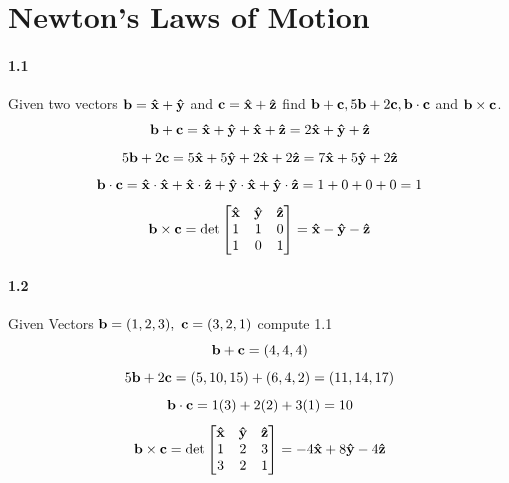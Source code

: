 \documentclass[../problems.tex]{subfiles}
\begin{document}
\section{Newton's Laws of Motion}
\barh

\paragraph{1.1}
Given two vectors $\mathbf{b} = \mathbf{\hat x} + \mathbf{\hat y} $ and $\mathbf{c} = \mathbf{\hat x} + 
\mathbf{\hat z}$ find $\mathbf{b} + \mathbf{c}, 5 \mathbf{b} + 2 \mathbf{c}, \mathbf{b}\cdot \mathbf{c}$ and $\mathbf{b}\times \mathbf{c}$.
\barh
\begin{equation*}
    \mathbf{b} + \mathbf{c} = \mathbf{\hat x} + \mathbf{\hat y} + \mathbf{\hat x} + \mathbf{\hat z} 
    = 2\mathbf{\hat x} + \mathbf{\hat y} + \mathbf{\hat z}
\end{equation*}
\begin{equation*}
    5 \mathbf{b} + 2 \mathbf{c} = 5\mathbf{\hat x} + 5\mathbf{\hat y} + 2\mathbf{\hat x} + 2\mathbf{\hat z} 
    = 7\mathbf{\hat x} + 5\mathbf{\hat y} + 2\mathbf{\hat z}
\end{equation*}
\begin{equation*}
    \mathbf{b} \cdot \mathbf{c} = \mathbf{\hat x} \cdot \mathbf{\hat x} + \mathbf{\hat x} \cdot 
    \mathbf{\hat z} + \mathbf{\hat y} \cdot \mathbf{\hat x} + \mathbf{\hat y} \cdot \mathbf{\hat z} 
    = 1 + 0 + 0 + 0 = 1
\end{equation*}
\begin{equation*} %
    \vect{b} \times \vect{c} = \det \begin{bmatrix}
        \vect{\hat x} & \vect{\hat y} & \vect{\hat z} \\
        1 & 1 & 0 \\
        1 & 0 & 1
    \end{bmatrix}
    = \vect{\hat x} - \vect{\hat y} - \vect{\hat z}
\end{equation*}

\paragraph{1.2}
Given Vectors $\mathbf{b}=(1,2,3) ,\ \mathbf{c} = (3,2,1)$ compute 1.1
\barh
\begin{equation*}
    \mathbf{b} + \mathbf{c} = (4,4,4)
\end{equation*}
\begin{equation*}
    5 \mathbf{b} + 2 \mathbf{c} = (5,10,15) + (6,4,2) = (11,14,17)
\end{equation*}
\begin{equation*}
    \mathbf{b} \cdot \mathbf{c} = 1(3) + 2(2) + 3(1) = 10
\end{equation*}
\begin{equation*}
    \mathbf{b} \times \mathbf{c} = \det \begin{bmatrix}
        \mathbf{\hat x} & \mathbf{\hat y} & \mathbf{\hat z} \\
        1 & 2 & 3 \\
        3 & 2 & 1
    \end{bmatrix}
    = -4\mathbf{\hat x} + 8\mathbf{\hat y} - 4\mathbf{\hat z}
\end{equation*}
\end{document}
